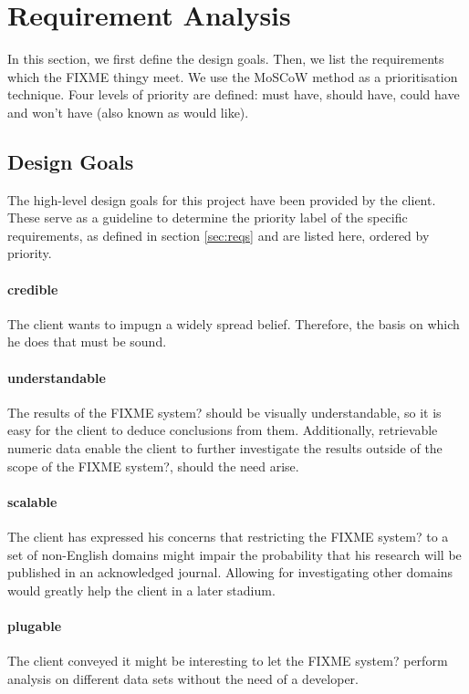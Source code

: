 \section {Requirement Analysis}
In this section, we first define the design goals. Then, we list the requirements which the {\color{red} FIXME thingy} meet. We use the MoSCoW method\cite{clegg1994case} as a prioritisation technique. Four levels of priority are defined: must have, should have, could have and won't have (also known as would like).

\subsection{Design Goals}
The high-level design goals for this project have been provided by the client. These serve as a guideline to determine the priority label of the specific requirements, as defined in section \ref{sec:reqs} and are listed here, ordered by priority.

\paragraph{credible} The client wants to impugn a widely spread belief. Therefore, the basis on which he does that must be sound.
\paragraph{understandable} The results of the {\color{red} FIXME system?} should be visually understandable, so it is easy for the client to deduce conclusions from them. Additionally, retrievable numeric data enable the client to further investigate the results outside of the scope of the {\color{red} FIXME system?}, should the need arise.
\paragraph{scalable} The client has expressed his concerns that restricting the {\color{red} FIXME system?} to a set of non-English domains might impair the probability that his research will be published in an acknowledged journal. Allowing for investigating other domains would greatly help the client in a later stadium.
\paragraph{plugable} The client conveyed it might be interesting to let the {\color{red} FIXME system?} perform analysis on different data sets without the need of a developer. 

